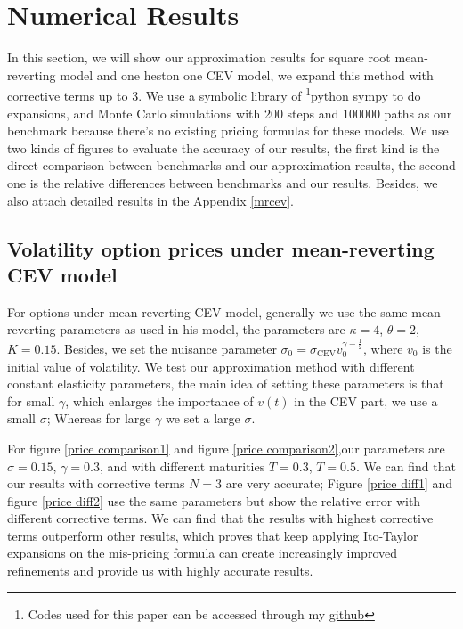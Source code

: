 \chapter{Numerical Results}

In this section, we will show our approximation results for square root mean-reverting model and one heston one CEV model, we expand this method with corrective terms up to 3. We use a symbolic library of \footnote{Codes used for this paper can be accessed through my \href{https://github.com/ywang408/master-thesis-code}{github}}{python} \href{https://www.sympy.org/en/index.html}{sympy} to do expansions, and Monte Carlo simulations with 200 steps and 100000 paths as our benchmark because there's no existing pricing formulas for these models. We use two kinds of figures to evaluate the accuracy of our results, the first kind is the direct comparison between benchmarks and our approximation results, the second one is the relative differences between benchmarks and our results. Besides, we also attach detailed results in the Appendix \ref{mrcev}.

\section{Volatility option prices under mean-reverting CEV model}

For options under mean-reverting CEV model, generally we use the same mean-reverting parameters as \cite{grunbichler_valuing_1996} used in his model, the parameters are $\kappa=4$, $\theta=2$, $K=0.15$. Besides, we set the nuisance parameter $\sigma_0 = \sigma_{\text{CEV}} v_0^{\gamma-\frac{1}{2}}$, where $v_0$ is the initial value of volatility. We test our approximation method with different constant elasticity parameters, the main idea of setting these parameters is that for small $\gamma$, which enlarges the importance of $v(t)$ in the CEV part, we use a small $\sigma$; Whereas for large $\gamma$ we set a large $\sigma$. 

For figure \ref{price comparison1} and figure \ref{price comparison2},our parameters are $\sigma=0.15$, $\gamma=0.3$, and with different maturities $T=0.3$, $T=0.5$. We can find that our results with corrective terms $N=3$ are very accurate; Figure \ref{price diff1} and figure \ref{price diff2} use the same parameters but show the relative error with different corrective terms. We can find that the results with highest corrective terms outperform other results, which proves that keep applying Ito-Taylor expansions on the mis-pricing formula can create increasingly improved refinements and provide us with highly accurate results.

